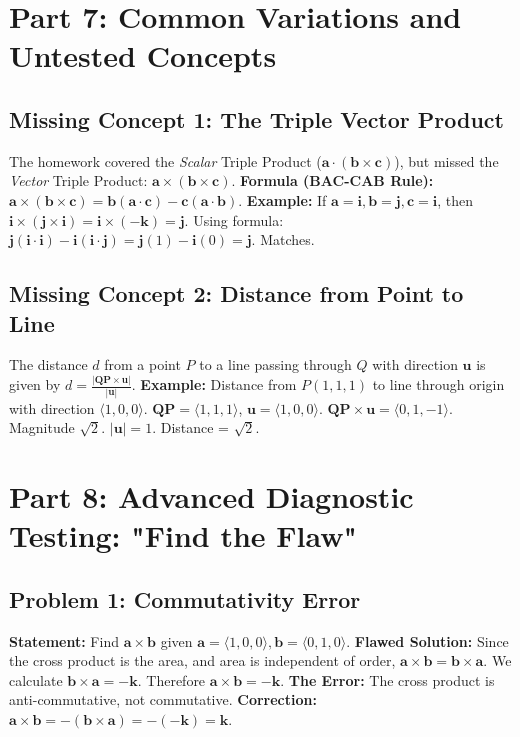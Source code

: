 \documentclass[11pt]{article}
\renewcommand{\vec}[1]{\mathbf{#1}}
\newcommand{\ihat}{\mathbf{i}}
\newcommand{\jhat}{\mathbf{j}}
\newcommand{\khat}{\mathbf{k}}
\begin{document}
\newpage

\section{Part 7: Common Variations and Untested Concepts}

\subsection{Missing Concept 1: The Triple Vector Product}
The homework covered the \textit{Scalar} Triple Product ($\vec{a} \cdot (\vec{b} \times \vec{c})$), but missed the \textit{Vector} Triple Product: $\vec{a} \times (\vec{b} \times \vec{c})$.
\textbf{Formula (BAC-CAB Rule):} $\vec{a} \times (\vec{b} \times \vec{c}) = \vec{b}(\vec{a} \cdot \vec{c}) - \vec{c}(\vec{a} \cdot \vec{b})$.
\textbf{Example:} If $\vec{a}=\ihat, \vec{b}=\jhat, \vec{c}=\ihat$, then $\ihat \times (\jhat \times \ihat) = \ihat \times (-\khat) = \jhat$.
Using formula: $\jhat(\ihat \cdot \ihat) - \ihat(\ihat \cdot \jhat) = \jhat(1) - \ihat(0) = \jhat$. Matches.

\subsection{Missing Concept 2: Distance from Point to Line}
The distance $d$ from a point $P$ to a line passing through $Q$ with direction $\vec{u}$ is given by $d = \frac{|\vec{QP} \times \vec{u}|}{|\vec{u}|}$.
\textbf{Example:} Distance from $P(1,1,1)$ to line through origin with direction $\langle 1,0,0 \rangle$.
$\vec{QP} = \langle 1,1,1 \rangle$, $\vec{u}=\langle 1,0,0 \rangle$.
$\vec{QP} \times \vec{u} = \langle 0, 1, -1 \rangle$. Magnitude $\sqrt{2}$.
$|\vec{u}| = 1$. Distance = $\sqrt{2}$.

\section{Part 8: Advanced Diagnostic Testing: "Find the Flaw"}

\subsection{Problem 1: Commutativity Error}
\textbf{Statement:} Find $\vec{a} \times \vec{b}$ given $\vec{a}=\langle 1,0,0 \rangle, \vec{b}=\langle 0,1,0 \rangle$.
\textbf{Flawed Solution:} Since the cross product is the area, and area is independent of order, $\vec{a} \times \vec{b} = \vec{b} \times \vec{a}$. We calculate $\vec{b} \times \vec{a} = -\khat$. Therefore $\vec{a} \times \vec{b} = -\khat$.
\textbf{The Error:} The cross product is anti-commutative, not commutative.
\textbf{Correction:} $\vec{a} \times \vec{b} = -(\vec{b} \times \vec{a}) = -(-\khat) = \khat$.
\end{document}

